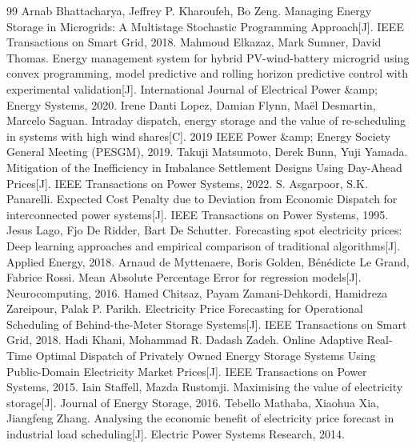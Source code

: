 \begin{thebibliography}{99}
Arnab Bhattacharya, Jeffrey P. Kharoufeh, Bo Zeng. Managing Energy Storage in Microgrids: A Multistage Stochastic Programming Approach[J]. IEEE Transactions on Smart Grid, 2018.
Mahmoud Elkazaz, Mark Sumner, David Thomas. Energy management system for hybrid PV-wind-battery microgrid using convex programming, model predictive and rolling horizon predictive control with experimental validation[J]. International Journal of Electrical Power \&amp; Energy Systems, 2020.
Irene Danti Lopez, Damian Flynn, Maël Desmartin, Marcelo Saguan. Intraday dispatch, energy storage and the value of re-scheduling in systems with high wind shares[C]. 2019 IEEE Power \&amp; Energy Society General Meeting (PESGM), 2019.
Takuji Matsumoto, Derek Bunn, Yuji Yamada. Mitigation of the Inefficiency in Imbalance Settlement Designs Using Day-Ahead Prices[J]. IEEE Transactions on Power Systems, 2022.
S. Asgarpoor, S.K. Panarelli. Expected Cost Penalty due to Deviation from Economic Dispatch for interconnected power systems[J]. IEEE Transactions on Power Systems, 1995.
Jesus Lago, Fjo De Ridder, Bart De Schutter. Forecasting spot electricity prices: Deep learning approaches and empirical comparison of traditional algorithms[J]. Applied Energy, 2018.
Arnaud de Myttenaere, Boris Golden, Bénédicte Le Grand, Fabrice Rossi. Mean Absolute Percentage Error for regression models[J]. Neurocomputing, 2016.
Hamed Chitsaz, Payam Zamani-Dehkordi, Hamidreza Zareipour, Palak P. Parikh. Electricity Price Forecasting for Operational Scheduling of Behind-the-Meter Storage Systems[J]. IEEE Transactions on Smart Grid, 2018.
Hadi Khani, Mohammad R. Dadash Zadeh. Online Adaptive Real-Time Optimal Dispatch of Privately Owned Energy Storage Systems Using Public-Domain Electricity Market Prices[J]. IEEE Transactions on Power Systems, 2015.
Iain Staffell, Mazda Rustomji. Maximising the value of electricity storage[J]. Journal of Energy Storage, 2016.
Tebello Mathaba, Xiaohua Xia, Jiangfeng Zhang. Analysing the economic benefit of electricity price forecast in industrial load scheduling[J]. Electric Power Systems Research, 2014.

\end{thebibliography}
